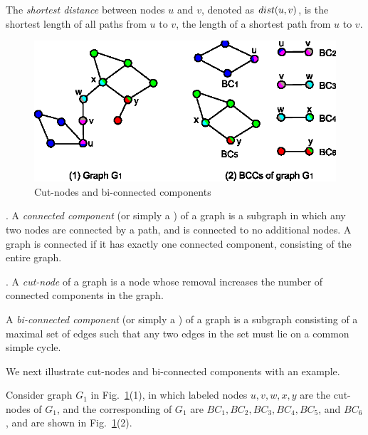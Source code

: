 The {\em shortest distance} between nodes $u$ and $v$, denoted as $\dist(u, v)$, is the shortest length of all paths from $u$ to $v$, \ie
the length of a shortest path from $u$ to $v$.


\begin{figure}[tb!]
\begin{center}
\includegraphics[scale=0.9]{./cut-nodes.eps}
\end{center}
\vspace{-2ex}
\caption{Cut-nodes and bi-connected components}
  \label{fig-cut-nodes}\vspace{-3ex}
\end{figure}

.
A {\em connected component} (or simply a \cc) of a graph is a subgraph in which any two nodes are connected by a path, and is connected to no additional nodes.
A graph is connected if it has exactly one connected component, consisting of the entire graph.


.
A {\em cut-node} of a graph is a node whose removal increases the number of connected components in the graph.

A {\em bi-connected component} (or simply a \bc) of a graph is a subgraph consisting of a maximal set of edges such that any two edges in the set must lie on a common simple cycle.

We next illustrate cut-nodes and bi-connected components with an example.

\begin{example}
\label{exm-bccs} Consider graph $G_1$ in Fig.~\ref{fig-cut-nodes}(1), in which labeled nodes $u, v, w, x, y$ are the cut-nodes of $G_1$,
and the corresponding \bccs of $G_1$ are $BC_1, BC_2, BC_3, BC_4, BC_5$, and $BC_6$, and are shown in Fig.~\ref{fig-cut-nodes}(2).
\end{example}
